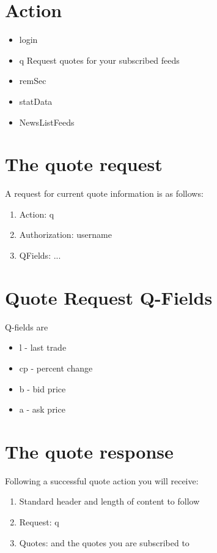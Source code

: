 



\section*{Action}
\begin{itemize}
\item login
\item q Request quotes for your subscribed feeds
\item remSec
\item statData
\item NewsListFeeds
\end{itemize}


\section*{The quote request}
A request for current quote information is as follows:

\begin{enumerate}
\item Action: q
\item Authorization: username
\item QFields: ...
\end{enumerate}

\section*{Quote Request Q-Fields}
Q-fields are
\begin{itemize}
\item l - last trade
\item cp - percent change
\item b - bid price
\item a - ask price
\end{itemize}

\section*{The quote response}
Following a successful quote action you will receive:

\begin{enumerate}
\item Standard header and length of content to follow
\item Request: q
\item Quotes: and the quotes you are subscribed to
\end{enumerate}

